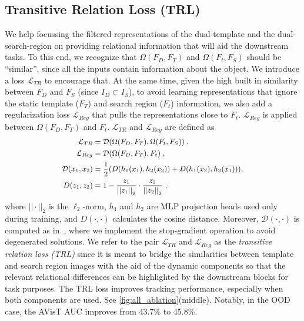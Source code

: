 \subsection{Transitive Relation Loss (TRL)}
We help focussing the filtered representations of the dual-template and the dual-search-region on providing relational information that will aid the downstream tasks. To this end, we recognize that $\Omega(F_D,F_T)$ and $\Omega(F_t,F_S)$ should be ``similar'', since all the inputs contain information about the object. We introduce a loss  $\mathcal{L}_{TR}$ to encourage that. At the same time, given the high built in similarity between $F_D$ and $F_S$ (since $I_D \subset I_S$), to avoid learning representations that ignore the static template ($F_T$) and search region ($F_t$) information, we also add a regularization loss $\mathcal{L}_{Reg}$ that pulls the representations close to $F_t$. $\mathcal{L}_{Reg}$ is applied between $\Omega(F_D,F_T)$ and $F_t$.
$\mathcal{L}_{TR}$ and $\mathcal{L}_{Reg}$ are defined as
\begin{equation}\small
  \centering
  \label{eq:relation}
      \begin{aligned} 
          \mathcal{L}_{TR}&=\mathcal{D}(\Omega(F_D,F_T),\Omega(F_t,F_S)) \; , \\
          \mathcal{L}_{Reg}&=\mathcal{D}(\Omega(F_D,F_T),F_t)\; , \\
          \mathcal{D}(x_1, x_2)&=\dfrac{1}{2} (D(h_1(x_1), h_2(x_2)) +  D(h_1(x_2), h_2(x_1))), \\
          D(z_1,z_2)&=1 - \dfrac{z_1}{{||z_1||}_2} \cdot \dfrac{z_2}{{||z_2||}_2} \; ,
      \end{aligned}
\end{equation}
where $||\cdot||_2$ is the $\ell_2$-norm,  $h_1$ and $h_2$ are MLP projection heads used only during training, and $D(\cdot, \cdot)$ calculates the cosine distance. Moreover, $\mathcal{D}(\cdot,\cdot)$ is computed as in~\cite{chen2021exploring}, where we implement the stop-gradient operation to avoid degenerated solutions. We refer to the pair $\mathcal{L}_{TR}$ and $\mathcal{L}_{Reg}$ as the \emph{transitive relation loss (TRL)} since it is meant to bridge the similarities between template and search region images with the aid of the dynamic components so that the relevant relational differences can be highlighted by the downstream blocks for task purposes. The TRL loss improves tracking performance, especially when both components are used. See \ref{fig:all_ablation}(middle). Notably, in the OOD case, the AVisT \cite{noman2022avist} AUC improves from 43.7\% to 45.8\%.


